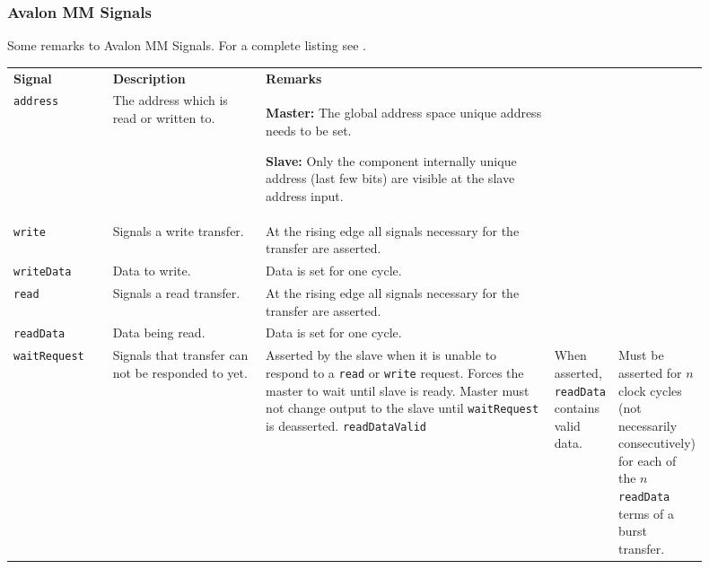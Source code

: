 		\subsubsection{Avalon MM Signals }
			Some remarks to Avalon MM Signals. For a complete listing see .
			\begin{longtable}{|p{0.15\linewidth}||p{0.25\linewidth}|p{0.5\linewidth}|}					
				\hline
				\textbf{Signal}
					& \textbf{Description}
					& \textbf{Remarks}\\
				\hhline{|=#=|=|}
				\texttt{address}
					& The address which is read or written to. 
					&   \textbf{Master:} The global address space unique address needs to be set.
					
					  	\textbf{Slave:} Only the component internally unique address (last few bits) are visible at the slave address input.\\
				\hline
				\texttt{write}
					& Signals a write transfer.
					& At the rising edge all signals necessary for the transfer are asserted.\\
				\hline
				\texttt{writeData}
					& Data to write.
					& Data is set for one cycle.\\
				\hline
				\texttt{read}
					& Signals a read transfer.
					& At the rising edge all signals necessary for the transfer are asserted.\\
				\hline
				\texttt{readData}
					& Data being read.
					& Data is set for one cycle.\\
				\hline
				\texttt{waitRequest}
					& Signals that transfer can not be responded to yet.
					& Asserted by the slave when it is unable to respond to a \texttt{read} or \texttt{write} request. Forces the master to wait until slave is ready. Master must not change output to the slave until \texttt{waitRequest} is deasserted.
				\hline
				\texttt{readDataValid}
					& When asserted, \texttt{readData} contains valid data.
					& Must be asserted for $n$ clock cycles (not necessarily consecutively) for each of the $n$ \texttt{readData} terms of a burst transfer.\\
				\hline
			\end{longtable}
			

